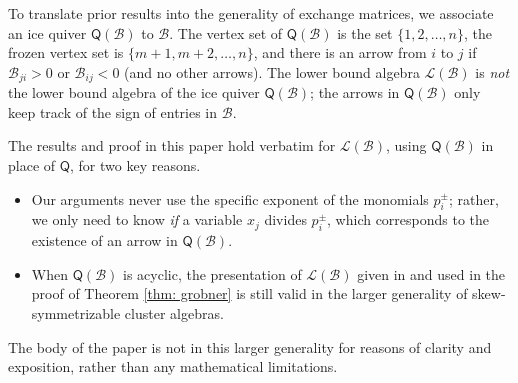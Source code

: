 \documentclass[ALCO,published]{cedram}
\numberwithin{equation}{section}
\newcommand{\B}{\mathcal{B}}
\renewcommand{\L}{\mathcal{L}}%
\newcommand{\1}{^{-1}}
\def\Q{\mathsf{Q}}
\begin{document}
%

To translate prior results into the generality of exchange matrices, we associate an ice quiver $\Q(\B)$ to $\B$.  The vertex set of $\Q(\B)$ is the set $\{1,2,\dots,n\}$, the frozen vertex set is $\{m+1,m+2,\dots,n\}$, and there is an arrow from $i$ to $j$ if $\B_{ji}>0$ or $\B_{ij}<0$ (and no other arrows).  The lower bound algebra $\L(\B)$ is \emph{not} the lower bound algebra of the ice quiver $\Q(\B)$; the arrows in $\Q(\B)$ only keep track of the sign of entries in $\B$.

The results and proof in this paper hold verbatim for $\L(\B)$, using $\Q(\B)$ in place of $\Q$, for two key reasons.
\begin{itemize}
	\item Our arguments never use the specific exponent of the monomials $p_i^\pm$; rather, we only need to know \emph{if} a variable $x_j$ divides $p_i^\pm$, which corresponds to the existence of an arrow in $\Q(\B)$.
	\item When $\Q(\B)$ is acyclic, the presentation of $\L(\B)$ given in \cite[Corollary 1.17]{BFZ05} and used in the proof of Theorem \ref{thm: grobner} is still valid in the larger generality of skew-symmetrizable cluster algebras.
\end{itemize}

\begin{rem}
The body of the paper is not in this larger generality for reasons of clarity and exposition, rather than any mathematical limitations.
\end{rem}
\end{document}

